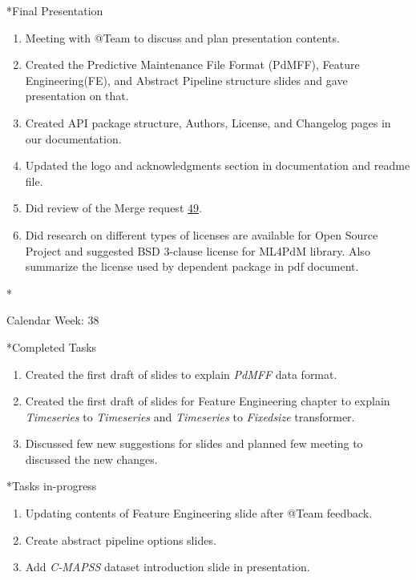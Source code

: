\documentclass[11pt,a4paper]{article}
\begin{document}
\begin{section}
\begin{subsection}
\begin{enumerate}
     \end{enumerate}
 \end{subsection}
 \begin{subsection}*{Final Presentation}
     \begin{enumerate}
         \item Meeting with @Team to discuss and plan presentation contents.
         \item Created the Predictive Maintenance File Format (PdMFF), Feature Engineering(FE), and Abstract Pipeline structure slides and gave presentation on that.
         \item Created API package structure, Authors, License, and Changelog pages in our documentation.
         \item Updated the logo and acknowledgments section in documentation and readme file.
         \item Did review of the Merge request \href{https://git.cs.uni-paderborn.de/machine-learning-for-predictive-maintenance/code/-/merge_requests/49}{49}.
         \item Did research on different types of licenses are available for Open Source Project and suggested BSD 3-clause license for ML4PdM library. Also summarize the license used by dependent package in pdf document.
     \end{enumerate}
 \end{subsection}
\end{section}

\newpage
\begin{section}*{Calendar Week: 38 \hfill \date{24 September, 2021}}
 \begin{subsection}*{Completed Tasks}
     \begin{enumerate}
         \item Created the first draft of slides to explain \textit{PdMFF} data format.
         \item Created the first draft of slides for Feature Engineering chapter to explain \textit{Timeseries} to \textit{Timeseries} and \textit{Timeseries} to \textit{Fixedsize} transformer.
         \item Discussed few new suggestions for slides and planned few meeting to discussed the new changes.
     \end{enumerate}
 \end{subsection}
 \begin{subsection}*{Tasks in-progress}
     \begin{enumerate}
         \item Updating contents of Feature Engineering slide after @Team feedback.
         \item Create abstract pipeline options slides.
         \item Add \textit{C-MAPSS} dataset introduction slide in presentation.
     \end{enumerate}
 \end{subsection}
\end{section}
\end{document}
